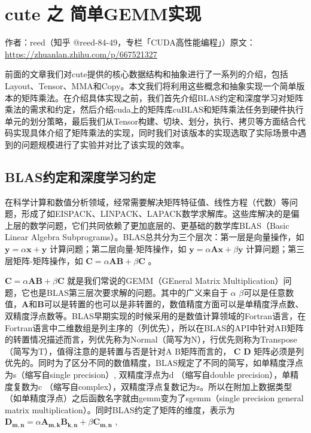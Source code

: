 \chapter{cute 之 简单GEMM实现}

\begin{center}\small 作者：reed（知乎 @reed-84-49，专栏「CUDA高性能编程」）\quad 原文：\url{https://zhuanlan.zhihu.com/p/667521327}\end{center}

前面的文章我们对cute提供的核心数据结构和抽象进行了一系列的介绍，包括Layout、Tensor、MMA和Copy。本文我们将利用这些概念和抽象实现一个简单版本的矩阵乘法。在介绍具体实现之前，我们首先介绍BLAS约定和深度学习对矩阵乘法的需求和约定，然后介绍cuda上的矩阵库cuBLAS和矩阵乘法任务到硬件执行单元的划分策略，最后我们从Tensor构建、切块、划分，执行、拷贝等方面结合代码实现具体介绍了矩阵乘法的实现，同时我们对该版本的实现选取了实际场景中遇到的问题规模进行了实验并对比了该实现的效率。

\section{BLAS约定和深度学习约定}

在科学计算和数值分析领域，经常需要解决矩阵特征值、线性方程（代数）等问题，形成了如EISPACK、LINPACK、LAPACK数学求解库。这些库解决的是偏上层的数学问题，它们共同依赖了更加底层的、更基础的数学库BLAS（Basic Linear Algebra Subprograms）。BLAS总共分为三个层次：第一层是向量操作，如 $\boldsymbol{y} = \alpha \boldsymbol{x} + \boldsymbol{y}$ 计算问题；第二层向量-矩阵操作，如 $\boldsymbol{y} = \alpha \boldsymbol{A} \boldsymbol{x} + \beta \boldsymbol{y}$ 计算问题；第三层矩阵-矩阵操作，如 $\boldsymbol{C} = \alpha \boldsymbol{A} \boldsymbol{B} + \beta \boldsymbol{C}$ 。

$\boldsymbol{C} = \alpha \boldsymbol{A} \boldsymbol{B} + \beta \boldsymbol{C}$ 就是我们常说的GEMM（GEneral Matrix Multiplication）问题，它也是BLAS第三层次要求解的问题。其中的广义来自于 $\alpha$ $\beta$可以是任意数值，$\boldsymbol{A}$和$\boldsymbol{B}$可以是转置的也可以是非转置的，数值精度方面可以是单精度浮点数、双精度浮点数等。BLAS早期实现的时候采用的是数值计算领域的Fortran语言，在Fortran语言中二维数组是列主序的（列优先），所以在BLAS的API中针对AB矩阵的转置情况描述而言，列优先称为Normal（简写为N），行优先则称为Transpose（简写为T），值得注意的是转置与否是针对A B矩阵而言的， $\boldsymbol{C}$ $\boldsymbol{D}$ 矩阵必须是列优先的。同时为了区分不同的数值精度，BLAS规定了不同的简写，如单精度浮点为s（缩写自single precision）, 双精度浮点为d （缩写自double precision），单精度复数为c （缩写自complex），双精度浮点复数记为z。所以在附加上数据类型（如单精度浮点）之后函数名字就由gemm变为了sgemm（single precision general matrix multiplication）。同时BLAS约定了矩阵的维度，表示为 $\boldsymbol{D_{m,n}} = \alpha \boldsymbol{A_{m, k}} \boldsymbol{B_{k, n}} + \beta \boldsymbol{C_{m,n}}$ ,

